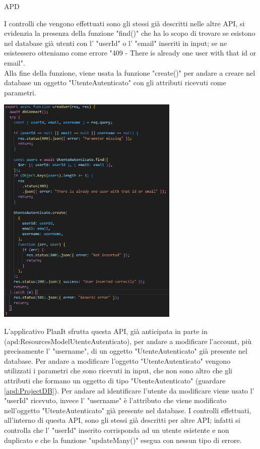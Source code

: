 \begin{listaPersonale} {APD}
\begin{listaPersonale2}[APD]{}
                I controlli che vengono effettuati sono gli stessi già descritti nelle altre API, si evidenzia la presenza della funzione "find()" che ha lo scopo di trovare se esistono nel database già utenti con l' "userId" o l' "email" inseriti in input; se ne esistessero otteniamo come errore "409 - There is already one user with that id or email". \\
                Alla fine della funzione, viene usata la funzione "create()" per andare a creare nel database un oggetto "UtenteAutenticato" con gli attributi ricevuti come parametri.
                \begin{center}
                    \includegraphics[width=0.65\textwidth, height=0.55\textheight]{img/png/APIs/creaUser.png}
                \end{center}
                \newpage
                L'applicativo PlanIt sfrutta questa API, già anticipata in parte in (apd:ResourcesModelUtenteAutenticato), per andare a modificare l'account, più precisamente l' "username", di un oggetto "UtenteAutenticato" già presente nel database. Per andare a modificare l'oggetto "UtenteAutenticato" vengono utilizzati i parametri che sono ricevuti in input, che non sono altro che gli attributi che formano un oggetto di tipo "UtenteAutenticato" (guardare \ref{apd:ProjectDB}). Per andare ad identificare l'utente da modificare viene usato l' "userId" ricevuto, invece l' "username" è l'attributo che viene modificato nell'oggetto "UtenteAutenticato" già presente nel database. I controlli effettuati, all'interno di questa API, sono gli stessi già descritti per altre API; infatti si controlla che l' "userId" inserito corrisponda ad un utente esistente e non duplicato e che la funzione "updateMany()" esegua con nessun tipo di errore.

\end{listaPersonale2}
\end{listaPersonale}
